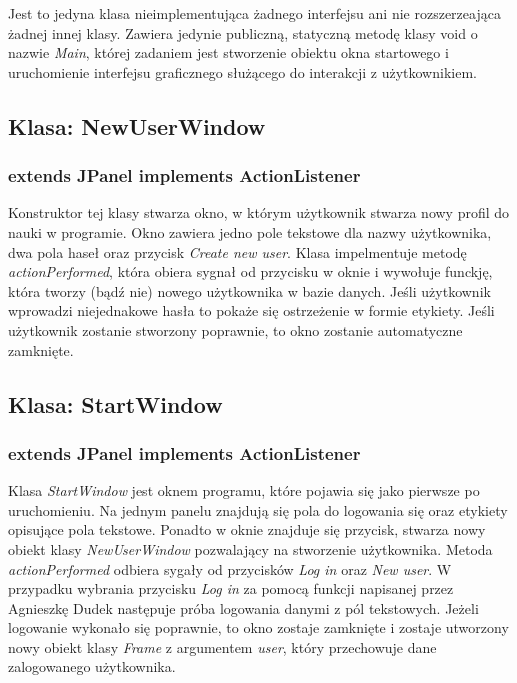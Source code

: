 \documentclass[11pt]{article}
\begin{document}
Jest to jedyna klasa nieimplementująca żadnego interfejsu ani nie rozszerzeająca żadnej innej klasy. Zawiera jedynie publiczną, statyczną metodę klasy void o nazwie \textit{Main}, której zadaniem jest stworzenie obiektu okna startowego i uruchomienie interfejsu graficznego służącego do interakcji z użytkownikiem.

\subsection{Klasa: NewUserWindow}
\subsubsection*{extends JPanel implements ActionListener}

Konstruktor tej klasy stwarza okno, w którym użytkownik stwarza nowy profil do nauki w programie. Okno zawiera jedno pole tekstowe dla nazwy użytkownika, dwa pola haseł oraz przycisk \textit{Create new user}. Klasa impelmentuje metodę \textit{actionPerformed}, która obiera sygnał od przycisku w oknie i wywołuje funckję, która tworzy (bądź nie) nowego użytkownika w bazie danych. Jeśli użytkownik wprowadzi niejednakowe hasła to pokaże się ostrzeżenie w formie etykiety. Jeśli użytkownik zostanie stworzony poprawnie, to okno zostanie automatyczne zamknięte.

\subsection{Klasa: StartWindow}
\subsubsection*{extends JPanel implements ActionListener}

Klasa \textit{StartWindow} jest oknem programu, które pojawia się jako pierwsze po uruchomieniu. Na jednym panelu znajdują się pola do logowania się oraz etykiety opisujące pola tekstowe. Ponadto w oknie znajduje się przycisk, stwarza nowy obiekt klasy \textit{NewUserWindow} pozwalający na stworzenie użytkownika. Metoda \textit{actionPerformed} odbiera sygały od przycisków \textit{Log in} oraz \textit{New user}. W przypadku wybrania przycisku \textit{Log in} za pomocą funkcji napisanej przez Agnieszkę Dudek następuje próba logowania danymi z pól tekstowych. Jeżeli logowanie wykonało się poprawnie, to okno zostaje zamknięte i zostaje utworzony nowy obiekt klasy \textit{Frame} z argumentem \textit{user}, który przechowuje dane zalogowanego użytkownika.
\end{document}
